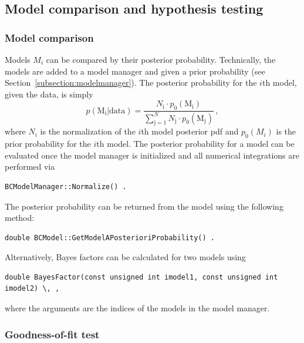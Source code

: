 \documentclass[11pt, a4paper]{article}
\begin{document}

\subsection{Model comparison and hypothesis testing} 


\subsubsection{Model comparison}

Models $M_{i}$ can be compared by their posterior
probability. Technically, the models are added to a model manager and
given a prior probability (see
Section~\ref{subsection:modelmanager}). The posterior probability for
the $i$th model, given the data, is simply
%
\begin{equation}
p(\mathrm{M_{i}}|\mathrm{data}) = \frac{N_{\mathrm{i}} \cdot p_{0}(\mathrm{M_{i}})}{\sum_{\mathrm{j} = 1}^{N} N_{\mathrm{j}} \cdot p_{0}(\mathrm{M_{j}})} \, , 
\end{equation}
%
where $N_{i}$ is the normalization of the $i$th model posterior pdf
and $p_{0}(M_{i})$ is the prior probability for the $i$th model. The
posterior probability for a model can be evaluated once the model
manager is initialized and all numerical integrations are performed
via
%
\begin{verbatim}
BCModelManager::Normalize() . 
\end{verbatim}
%
The posterior probability can be returned from the model using the
following method:
%
\begin{verbatim}
double BCModel::GetModelAPosterioriProbability() . 
\end{verbatim}

Alternatively, Bayes factors can be calculated for two models using
%
\begin{verbatim}
double BayesFactor(const unsigned int imodel1, const unsigned int imodel2) \, ,
\end{verbatim} 
%
\noindent
where the arguments are the indices of the models in the model
manager. 



\subsubsection{Goodness-of-fit test} 
\end{document}
